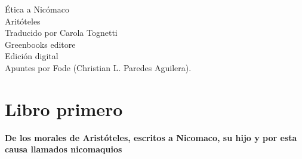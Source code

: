 \begin{center}
    \huge Ética a Nicómaco\\
    \vspace*{0.5cm}
    \large Aritóteles\\
    Traducido por Carola Tognetti\\
    Greenbooks editore\\
    Edición digital\\
    \vspace{1cm}
    \Large Apuntes por Fode (Christian L. Paredes Aguilera).
    \vspace{1.5cm}
\end{center}

\part*{Libro primero}
\textbf{De los morales de Aristóteles, escritos a Nicomaco, su hijo y por esta causa llamados nicomaquios}

